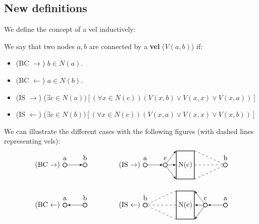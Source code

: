 \subsection{New definitions}
\label{sec:New definitions}
We define the concept of a vel inductively:
\begin{definition}
  We say that two nodes $a,b$ are connected by a \textbf{vel} ($V(a,b)$) if:
  \begin{itemize}
    \item (BC $\rightarrow$) $b \in N(a)$.
    \item (BC $\leftarrow$) $a \in N(b)$.
    \item (IS $\rightarrow$) ($\exists c \in N(a))[( \forall x \in N(c))(V(x,b) \vee V(x,x) \vee V(x,a))]$
      \item (IS $\leftarrow$) ($\exists c \in N(b))[( \forall x \in N(c))(V(x,a) \vee V(x,x) \vee V(x,b))]$
  \end{itemize}
\end{definition}
We can illustrate the different cases with the following figures (with dashed lines representing vels):
\[
  \begin{tikzpicture}
    [
    point/.style={thick,circle,draw,inner sep=0pt,minimum size=2mm},
    collection/.style={thick,rectangle,draw,inner sep=0pt,minimum height=14mm, minimum width= 9mm}
    ]
    \node (label) at (1,2) [label=left:(BC $\rightarrow$)] {};
    \node (0) at (1,2) [point,label=above:a] {};
    \node (1) at (2,2) [point,label=above:b] {};
    \draw [-latex] (0) to (1);

    \node (label) at (1,0) [label=left:(BC $\leftarrow$)] {};
    \node (0) at (1,0) [point,label=above:a] {};
    \node (1) at (2,0) [point,label=above:b] {};
    \draw [-latex] (1) to (0);

    \node (label) at (5,2) [label=left:(IS $\rightarrow$)] {};
    \node (0) at (5,2) [point,label=above:a] {};
    \node (1) at (6,2) [point,label=above:c] {};
    \node (2) at (7,2) [collection,label=center:N(c)] {};
    \node (3) at (9,2) [point,label=above:b] {};
    \draw [-latex] (0) to (1);
    \draw [-latex] (1) to (2.north west);
    \draw [-latex] (1) to (2.west);
    \draw [-latex] (1) to (2.south west);
    \draw [-, dashed] (2.north east) to (3);
    \draw [-, dashed] (2.east) to (3);
    \draw [-, dashed] (2.south east) to (3);

    \node (label) at (5,0) [label=left:(IS $\leftarrow$)] {};
    \node (0) at (9,0) [point,label=above:a] {};
    \node (1) at (8,0) [point,label=above:c] {};
    \node (2) at (7,0) [collection,label=center:N(c)] {};
    \node (3) at (5,0) [point,label=above:b] {};
    \draw [-latex] (0) to (1);
    \draw [-latex] (1) to (2.north east);
    \draw [-latex] (1) to (2.east);
    \draw [-latex] (1) to (2.south east);
    \draw [-, dashed] (2.north west) to (3);
    \draw [-, dashed] (2.west) to (3);
    \draw [-, dashed] (2.south west) to (3);
  \end{tikzpicture}
\]

